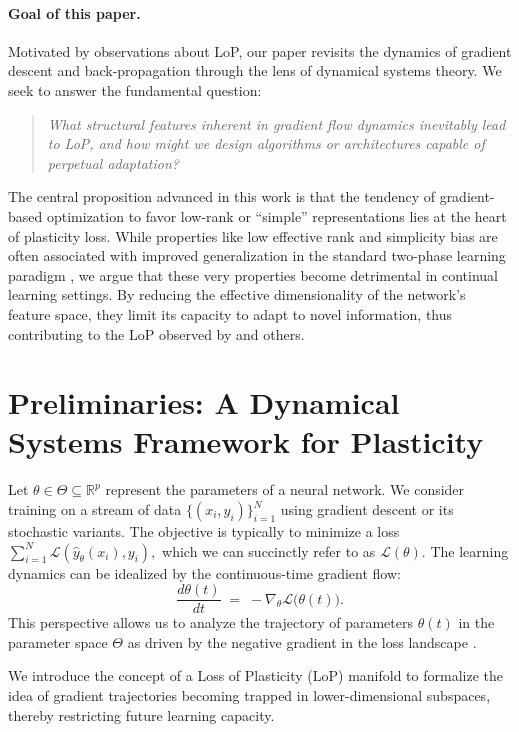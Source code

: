 \documentclass{article}
\newcommand{\Loss}{\mathcal{L}}
\newcommand{\R}{\mathbb{R}}
\begin{document}
\paragraph{Goal of this paper.}
Motivated by observations about LoP, our paper revisits the dynamics of gradient descent and back-propagation through the lens of dynamical systems theory. We seek to answer the fundamental question:
\begin{quote}
\emph{What structural features inherent in gradient flow dynamics inevitably lead to LoP, and how might we design algorithms or architectures capable of perpetual adaptation?}
\end{quote}
The central proposition advanced in this work is that the tendency of gradient-based optimization to favor low-rank or ``simple'' representations lies at the heart of plasticity loss. While properties like low effective rank and simplicity bias are often associated with improved generalization in the standard two-phase learning paradigm \citep{huh2022lowrank, papyan2020prevalence, zhang2017understanding}, we argue that these very properties become detrimental in continual learning settings. By reducing the effective dimensionality of the network's feature space, they limit its capacity to adapt to novel information, thus contributing to the LoP observed by \citep{dohare2024loss} and others.

\section{Preliminaries: A Dynamical Systems Framework for Plasticity}
\label{sec:framework}

Let $\theta\in\Theta\subseteq\R^p$ represent the parameters of a neural network. We consider training on a stream of data $\{(x_i,y_i)\}_{i=1}^N$ using gradient descent or its stochastic variants. The objective is typically to minimize a loss $\sum_{i=1}^N \Loss(\hat{y}_\theta(x_i),y_i),$ which we can succinctly refer to as $\Loss(\theta)$. The learning dynamics can be idealized by the continuous-time gradient flow:
\begin{equation}
    \frac{d\theta(t)}{dt} \;=\; -\nabla_\theta\Loss\bigl(\theta(t)\bigr).
    \label{eq:grad_flow}
\end{equation}
This perspective allows us to analyze the trajectory of parameters $\theta(t)$ in the parameter space $\Theta$ as driven by the negative gradient in the loss landscape \citep{saxe2014exact}.

We introduce the concept of a Loss of Plasticity (LoP) manifold to formalize the idea of gradient trajectories becoming trapped in lower-dimensional subspaces, thereby restricting future learning capacity.
\end{document}
